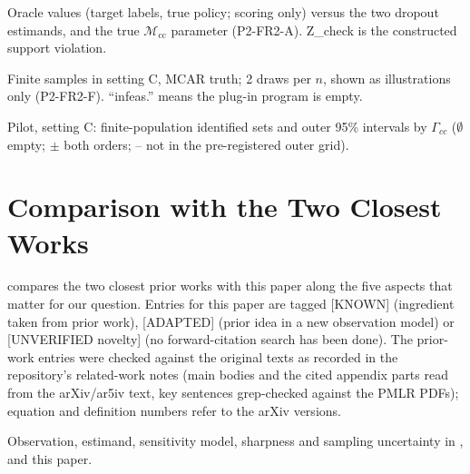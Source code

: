 \documentclass{article}
\theoremstyle{plain}
\theoremstyle{definition}
\theoremstyle{remark}
\newcommand{\todo}[1]{\textcolor{red}{[TODO: #1]}}
\newcommand{\Mcc}{\mathcal{M}_{\mathrm{cc}}}
\begin{document}
\begin{table}[t]
\centering\scriptsize
\caption{Oracle values (target labels, true policy; scoring only) versus the
two dropout estimands, and the true $\Mcc$ parameter (P2-FR2-A). Z\_check is
the constructed support violation.}
\label{tab:truths}
\resizebox{\columnwidth}{!}{}
\end{table}

\begin{table}[t]
\centering\scriptsize
\caption{Finite samples in setting C, MCAR truth; 2 draws per $n$, shown as
illustrations only (P2-FR2-F). ``infeas.'' means the plug-in program is
empty.}
\label{tab:finite}
\resizebox{\columnwidth}{!}{}
\end{table}

\begin{table}[h]
\centering\scriptsize\setlength{\tabcolsep}{3pt}
\caption{Pilot, setting C: finite-population identified sets and outer 95\%
intervals by $\Gamma_{cc}$ ($\emptyset$ empty; $\pm$ both orders; -- not in the
pre-registered outer grid).}
\label{tab:pilotiv}

\end{table}

\section{Comparison with the Two Closest Works}
\label{app:rw}
 compares the two closest prior works with this paper along the
five aspects that matter for our question. Entries for this paper are tagged
[KNOWN] (ingredient taken from prior work), [ADAPTED] (prior idea in a new
observation model) or [UNVERIFIED novelty] (no forward-citation search has
been done). The prior-work entries were checked against the original texts as
recorded in the repository's related-work notes (main bodies and the cited
appendix parts read from the arXiv/ar5iv text, key sentences grep-checked
against the PMLR PDFs); equation and definition numbers refer to the arXiv
versions.
\begin{table}[h]
\centering\scriptsize
\caption{Observation, estimand, sensitivity model, sharpness and sampling
uncertainty in \citet{subbaswamy2021evaluating}, \citet{guerdan2024predictive}
and this paper.}
\label{tab:rw}
\IfFileExists{tab_relatedwork.tex}{}{\todo{RW table pending}}
\end{table}
\end{document}
